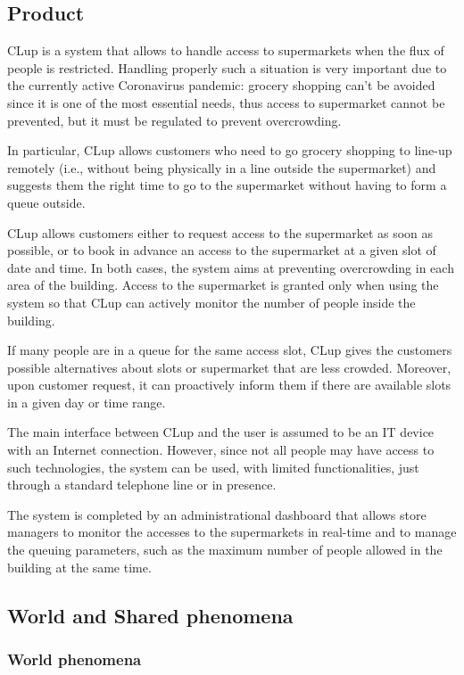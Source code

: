 \documentclass[../../main.tex]{subfiles}
\begin{document}
\subsection{Product}

CLup is a system that allows to handle access to supermarkets when the flux of
people is restricted. Handling properly such a situation is very important due
to the currently active Coronavirus pandemic: grocery shopping can't be avoided
since it is one of the most essential needs, thus access to supermarket cannot
be prevented, but it must be regulated to prevent overcrowding.

In particular, CLup allows customers who need to go grocery shopping to line-up
remotely (i.e., without being physically in a line outside the supermarket) and
suggests them the right time to go to the supermarket without having to form a queue
outside.

CLup allows customers either to request access to the supermarket as soon as
possible, or to book in advance an access to the supermarket at a given slot of
date and time. In both cases, the system aims at preventing overcrowding in each
area of the building. Access to the supermarket is granted only when using the
system so that CLup can actively monitor the number of people inside the
building.

If many people are in a queue for the same access slot, CLup gives the customers
possible alternatives about slots or supermarket that are less crowded.
Moreover, upon customer request, it can proactively inform them if there are
available slots in a given day or time range.

The main interface between CLup and the user is assumed to be an IT
device with an Internet connection. However, since not all people may have
access to such technologies, the system can be used, with limited
functionalities, just through a standard telephone line or in presence.

The system is completed by an administrational dashboard that allows store
managers to monitor the accesses to the supermarkets in real-time and to manage
the queuing parameters, such as the maximum number of people allowed in the
building at the same time.

\subsection{World and Shared phenomena}

\subsubsection{World phenomena}
\end{document}

